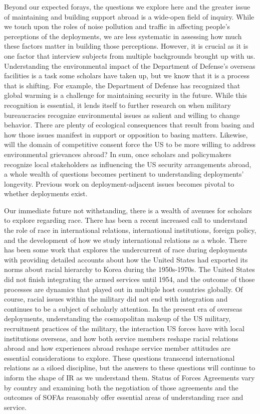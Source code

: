 Beyond our expected forays, the questions we explore here and the greater issue of maintaining and building support abroad is a wide-open field of inquiry. While we touch upon the roles of noise pollution and traffic in affecting people's perceptions of the deployments, we are less systematic in assessing how much these factors matter in building those perceptions. However, it is crucial as it is one factor that interview subjects from multiple backgrounds brought up with us. Understanding the environmental impact of the Department of Defense's overseas facilities is a task some scholars have taken up, but we know that it is a process that is shifting. For example, the Department of Defense has recognized that global warming is a challenge for maintaining security in the future. While this recognition is essential, it lends itself to further research on when military bureaucracies recognize environmental issues as salient and willing to change behavior. There are plenty of ecological consequences that result from basing and how those issues manifest in support or opposition to basing matters. Likewise, will the domain of competitive consent force the US to be more willing to address environmental grievances abroad? In sum, once scholars and policymakers recognize local stakeholders as influencing the US security arrangements abroad, a whole wealth of questions becomes pertinent to understanding deployments' longevity. Previous work on deployment-adjacent issues becomes pivotal to whether deployments exist.

Our immediate future not withstanding, there is a wealth of avenues for scholars to explore regarding race. There has been a recent increased call to understand the role of race in international relations, international institutions, foreign policy, and the development of how we study international relations as a whole. There has been some work that explores the undercurrent of race during deployments with  providing detailed accounts about how the United States had exported its norms about racial hierarchy to Korea during the 1950s-1970s. The United States did not finish integrating the armed services until 1954, and the outcome of those processes are dynamics that played out in multiple host countries globally. Of course, racial issues within the military did not end with integration and continues to be a subject of scholarly attention. In the present era of overseas deployments, understanding the cosmopolitan makeup of the US military, recruitment practices of the military, the interaction US forces have with local institutions overseas, and how both service members reshape racial relations abroad and how experiences abroad reshape service member attitudes are essential considerations to explore. These questions transcend international relations as a siloed discipline, but the answers to these questions will continue to inform the shape of IR as we understand them. Status of Forces Agreements vary by country and examining both the negotiation of those agreements and the outcomes of SOFAs reasonably offer essential areas of understanding race and service. %

